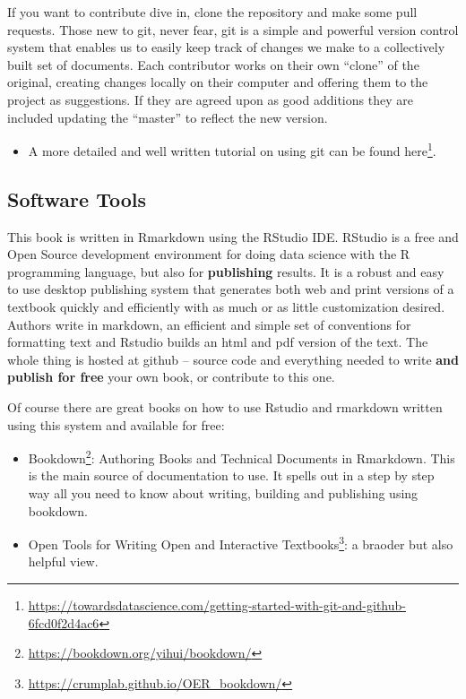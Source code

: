 \documentclass[
  12pt, openany]{book}
\providecommand{\tightlist}{%
  \setlength{\itemsep}{0pt}\setlength{\parskip}{0pt}}
\renewcommand{\href}[2]{#2\footnote{\url{#1}}}
\begin{document}
If you want to contribute dive in, clone the repository and make some pull requests. Those new to git, never fear, git is a simple and powerful version control system that enables us to easily keep track of changes we make to a collectively built set of documents. Each contributor works on their own ``clone'' of the original, creating changes locally on their computer and offering them to the project as suggestions. If they are agreed upon as good additions they are included updating the ``master'' to reflect the new version.

\begin{itemize}
\tightlist
\item
  A more detailed and well written tutorial \href{https://towardsdatascience.com/getting-started-with-git-and-github-6fcd0f2d4ac6}{on using git can be found here}.
\end{itemize}

\hypertarget{software-tools}{%
\subsection{Software Tools}\label{software-tools}}

This book is written in Rmarkdown using the RStudio IDE. RStudio is a free and Open Source development environment for doing data science with the R programming language, but also for \textbf{publishing} results. It is a robust and easy to use desktop publishing system that generates both web and print versions of a textbook quickly and efficiently with as much or as little customization desired. Authors write in markdown, an efficient and simple set of conventions for formatting text and Rstudio builds an html and pdf version of the text. The whole thing is hosted at github -- source code and everything needed to write \textbf{and publish for free} your own book, or contribute to this one.

Of course there are great books on how to use Rstudio and rmarkdown written using this system and available for free:

\begin{itemize}
\item
  \href{https://bookdown.org/yihui/bookdown/}{Bookdown}: Authoring Books and Technical Documents in Rmarkdown. This is the main source of documentation to use. It spells out in a step by step way all you need to know about writing, building and publishing using bookdown.
\item
  \href{https://crumplab.github.io/OER_bookdown/}{Open Tools for Writing Open and Interactive Textbooks}: a braoder but also helpful view.
\end{itemize}
\end{document}
